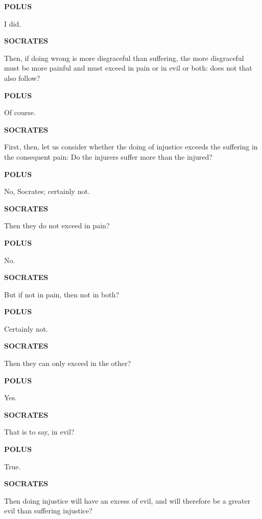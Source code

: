 \documentclass[11pt,letter]{article}
\begin{document}
\par \textbf{POLUS}
\par   I did.

\par \textbf{SOCRATES}
\par   Then, if doing wrong is more disgraceful than suffering, the more disgraceful must be more painful and must exceed in pain or in evil or both:  does not that also follow?

\par \textbf{POLUS}
\par   Of course.

\par \textbf{SOCRATES}
\par   First, then, let us consider whether the doing of injustice exceeds the suffering in the consequent pain:  Do the injurers suffer more than the injured?

\par \textbf{POLUS}
\par   No, Socrates; certainly not.

\par \textbf{SOCRATES}
\par   Then they do not exceed in pain?

\par \textbf{POLUS}
\par   No.

\par \textbf{SOCRATES}
\par   But if not in pain, then not in both?

\par \textbf{POLUS}
\par   Certainly not.

\par \textbf{SOCRATES}
\par   Then they can only exceed in the other?

\par \textbf{POLUS}
\par   Yes.

\par \textbf{SOCRATES}
\par   That is to say, in evil?

\par \textbf{POLUS}
\par   True.

\par \textbf{SOCRATES}
\par   Then doing injustice will have an excess of evil, and will therefore be a greater evil than suffering injustice?
\end{document}
